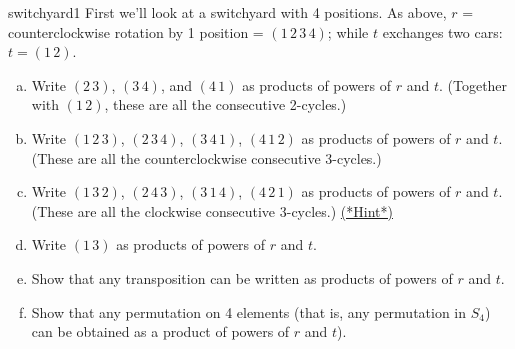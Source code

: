 \begin{exercise}{switchyard1}
First we'll look at a switchyard with 4 positions.  As above, $r$ = counterclockwise rotation by 1 position = $(1 \, 2 \, 3 \, 4)$; while $t$  exchanges two cars: $t = (1 \, 2)$. 
\begin{enumerate}[(a)]
\item
Write $(2 \, 3)$, $(3 \, 4)$, and $(4 \, 1)$ as products of powers of $r$ and $t$. (Together with $(1 \, 2)$, these are all the  consecutive 2-cycles.)
\item
Write $(1 \, 2 \, 3)$, $(2 \, 3 \, 4)$, $(3 \, 4 \, 1)$, $(4 \, 1 \, 2)$ as products of powers of $r$ and $t$. (These are all the counterclockwise consecutive  3-cycles.)
\item
Write $(1 \, 3 \, 2)$, $(2 \, 4 \, 3)$, $(3 \, 1 \, 4)$, $(4 \, 2 \, 1)$ as products of powers of $r$ and $t$. (These are all the clockwise consecutive 3-cycles.)
\hyperref[sec:Permutations:Hints]{(*Hint*)}
\item
Write $(1 \, 3)$ as products of powers of $r$ and $t$.
\item
Show that any transposition can be written as products of powers of $r$ and $t$.
\item
Show that any permutation  on 4 elements (that is, any permutation in $S_4$) can be obtained as a product of powers of $r$ and $t$).
\end{enumerate}
\end{exercise}

